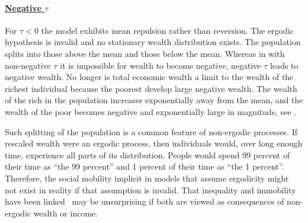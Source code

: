 \paragraph{\underline{Negative $\tau$}}
\mbox{}

For $\tau<0$ the model exhibits mean repulsion rather than reversion. The ergodic hypothesis is invalid and no stationary wealth distribution exists. The population splits into those above the mean and those below the mean. Whereas in \RGBM with non-negative $\tau$ it is impossible for wealth to become negative, negative $\tau$ leads to negative wealth. No longer is total economic wealth a limit to the wealth of the richest individual because the poorest develop large negative wealth. The wealth of the rich in the population increases exponentially away from the mean, and the wealth of the poor becomes negative and exponentially large in magnitude, see .

Such splitting of the population is a common feature of non-ergodic processes. If rescaled wealth were an ergodic process, then individuals would, over long enough time, experience all parts of its distribution. People would spend 99 percent of their time as ``the 99 percent'' and 1 percent of their time as ``the 1 percent''. Therefore, the social mobility implicit in models that assume ergodicity might not exist in reality if that assumption is invalid. That inequality and immobility have been linked~\cite{Corak2013,LiuETAL2013,berman2017} may be unsurprising if both are viewed as consequences of non-ergodic wealth or income.

